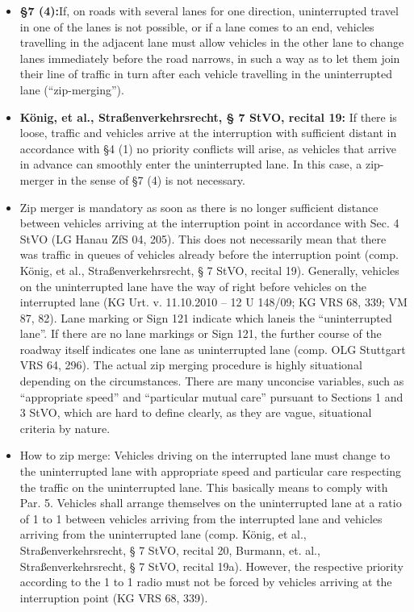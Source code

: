 \begin{itemize}
	\item \textbf{\stvo \S 7 (4):}If, on roads with several lanes for one direction, uninterrupted travel in one of the lanes is not possible, or if a lane comes to an end, vehicles travelling in the adjacent lane must allow vehicles in the other lane to change lanes immediately before the road narrows, in such a way as to let them join their line of traffic in turn after each vehicle travelling in the uninterrupted lane (“zip-merging”).
	
	\item \textbf{König, et al., Straßenverkehrsrecht, § 7 StVO, recital 19:} If there is loose, traffic and vehicles arrive at the interruption with sufficient distant in accordance
	with \stvo \S 4 (1) no priority conflicts will arise, as vehicles that arrive in
	advance can smoothly enter the uninterrupted lane. In this case, a zip-merger in the sense of \stvo \S 7 (4) is not necessary.
	
	\item Zip merger is mandatory as soon as there is no longer sufficient distance between vehicles arriving at
	the interruption point in accordance with Sec. 4 StVO (LG Hanau ZfS 04, 205). This does not
	necessarily mean that there was traffic in queues of vehicles already before the interruption point
	(comp. König, et al., Straßenverkehrsrecht, § 7 StVO, recital 19). Generally, vehicles on the
	uninterrupted lane have the way of right before vehicles on the interrupted lane (KG Urt. v.
	11.10.2010 – 12 U 148/09; KG VRS 68, 339; VM 87, 82). Lane marking or Sign 121 indicate which laneis the “uninterrupted lane”. If there are no lane markings or Sign 121, the further course of the
	roadway itself indicates one lane as uninterrupted lane (comp. OLG Stuttgart VRS 64, 296). The actual zip merging procedure is highly situational depending on the circumstances. There are
	many unconcise variables, such as “appropriate speed” and “particular mutual care” pursuant to
	Sections 1 and 3 StVO, which are hard to define clearly, as they are vague, situational criteria by
	nature.
	
	\item How to zip merge:
	Vehicles driving on the interrupted lane must change to the uninterrupted lane with appropriate
	speed and particular care respecting the traffic on the uninterrupted lane. This basically means to
	comply with Par. 5. Vehicles shall arrange themselves on the uninterrupted lane at a ratio of 1 to 1
	between vehicles arriving from the interrupted lane and vehicles arriving from the uninterrupted
	lane (comp. König, et al., Straßenverkehrsrecht, § 7 StVO, recital 20, Burmann, et. al.,
	Straßenverkehrsrecht, § 7 StVO, recital 19a). However, the respective priority according to the 1 to 1
	radio must not be forced by vehicles arriving at the interruption point (KG VRS 68, 339).
	

\end{itemize}
